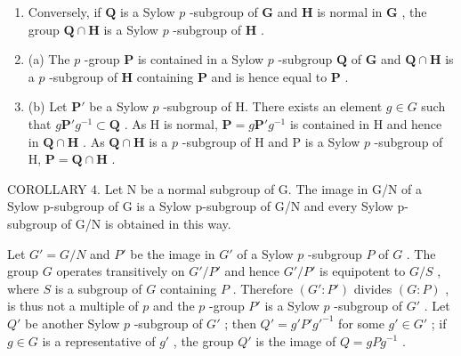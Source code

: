 \begin{enumerate}
\def\labelenumi{(\alph{enumi})}
\setcounter{enumi}{1}
\item
  Conversely, if \(\mathbf{Q}\) is a Sylow \(p\) -subgroup of \(\mathbf{G}\) and \(\mathbf{H}\) is normal in \(\mathbf{G}\) , the group \(\mathbf{Q} \cap \mathbf{H}\) is a Sylow \(p\) -subgroup of \(\mathbf{H}\) .
\item
  (a) The \(p\) -group \(\mathbf{P}\) is contained in a Sylow \(p\) -subgroup \(\mathbf{Q}\) of \(\mathbf{G}\) and \(\mathbf{Q} \cap \mathbf{H}\) is a \(p\) -subgroup of \(\mathbf{H}\) containing \(\mathbf{P}\) and is hence equal to \(\mathbf{P}\) .
\item
  (b) Let \(\mathbf{P}'\) be a Sylow \(p\) -subgroup of H. There exists an element \(g \in G\) such that \(g\mathbf{P}'g^{-1} \subset \mathbf{Q}\) . As H is normal, \(\mathbf{P} = g\mathbf{P}'g^{-1}\) is contained in H and hence in \(\mathbf{Q} \cap \mathbf{H}\) . As \(\mathbf{Q} \cap \mathbf{H}\) is a \(p\) -subgroup of H and P is a Sylow \(p\) -subgroup of H, \(\mathbf{P} = \mathbf{Q} \cap \mathbf{H}\) .
\end{enumerate}

COROLLARY 4. Let N be a normal subgroup of G. The image in G/N of a Sylow p-subgroup of G is a Sylow p-subgroup of G/N and every Sylow p-subgroup of G/N is obtained in this way.

Let \(G' = G/N\) and \(P'\) be the image in \(G'\) of a Sylow \(p\) -subgroup \(P\) of \(G\) . The group \(G\) operates transitively on \(G'/P'\) and hence \(G'/P'\) is equipotent to \(G/S\) , where \(S\) is a subgroup of \(G\) containing \(P\) . Therefore \((G':P')\) divides \((G:P)\) , is thus not a multiple of \(p\) and the \(p\) -group \(P'\) is a Sylow \(p\) -subgroup of \(G'\) . Let \(Q'\) be another Sylow \(p\) -subgroup of \(G'\) ; then \(Q' = g'P'g'^{-1}\) for some \(g' \in G'\) ; if \(g \in G\) is a representative of \(g'\) , the group \(Q'\) is the image of \(Q = gPg^{-1}\) .

